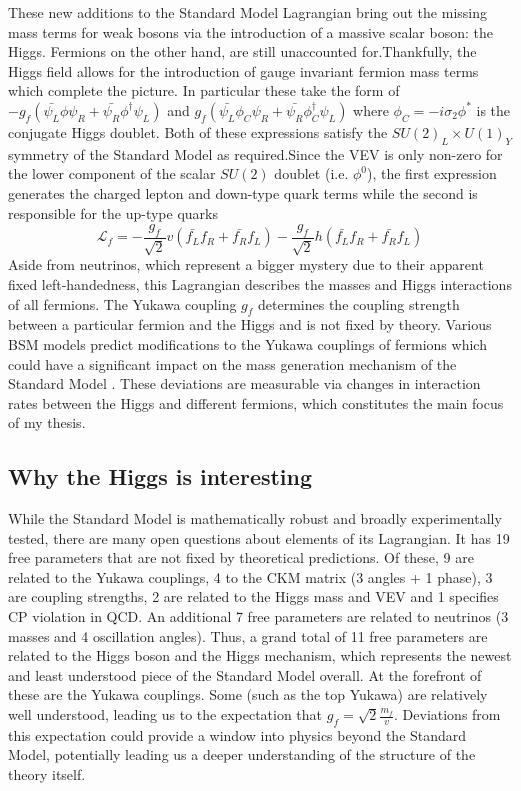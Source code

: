 These new additions to the Standard Model Lagrangian bring out the missing mass terms for weak bosons 
via the introduction of a massive scalar boson: the Higgs. Fermions on the other hand, are still unaccounted 
for.Thankfully, the Higgs field allows for the introduction of gauge invariant fermion mass terms which 
complete the picture. In particular these take the form of 
$-g_f(\bar{\psi_L}\phi\psi_R + \bar{\psi_R}\phi^{\dagger}\psi_L)$ and 
$g_f(\bar{\psi_L}\phi_C\psi_R + \bar{\psi_R}\phi_C^{\dagger}\psi_L)$ where $\phi_C = -i\sigma_2\phi^*$ 
is the conjugate Higgs doublet. Both of these expressions satisfy the $SU(2)_L \times U(1)_Y$ symmetry of 
the Standard Model as required.Since the VEV is only non-zero for the lower component of the scalar 
$SU(2)$ doublet (i.e. $\phi^0$), the first expression generates the charged lepton and down-type quark 
terms while the second is responsible for the up-type quarks
\begin{equation}
\mathcal{L}_f = -\frac{g_f}{\sqrt{2}}v(\bar{f_L}f_R + \bar{f_R}f_L) - 
\frac{g_f}{\sqrt{2}}h(\bar{f_L}f_R + \bar{f_R}f_L)
\end{equation}
Aside from neutrinos, which represent a bigger mystery due to their apparent fixed left-handedness, this 
Lagrangian describes the masses and Higgs interactions of all fermions. The Yukawa coupling 
$g_f$ determines the coupling strength between a particular fermion and the Higgs and is not fixed by 
theory. Various BSM models predict modifications to the Yukawa couplings of fermions which could have a 
significant impact on the mass generation mechanism of the Standard Model 
\cite{gunion-2hdm, carena-mssm}. These deviations are measurable via changes in interaction rates 
between the Higgs and different fermions, which constitutes the main focus of my thesis.

\subsection{Why the Higgs is interesting}

While the Standard Model is mathematically robust and broadly experimentally tested, there are many open 
questions about elements of its Lagrangian. It has 19 free parameters that are not fixed by theoretical 
predictions. Of these, 9 are related to the Yukawa couplings, 4 to the CKM matrix (3 angles + 1 phase), 3 are 
coupling strengths, 2 are related to the Higgs mass and VEV and 1 specifies CP violation in QCD. An additional 7 
free parameters are related to neutrinos (3 masses and 4 oscillation angles). Thus, a grand total of 11 free 
parameters are related to the Higgs boson and the Higgs mechanism, which represents the newest and least 
understood piece of the Standard Model overall. At the forefront of these are the Yukawa couplings. Some 
(such as the top Yukawa) are relatively well understood, leading us to the expectation that 
$g_f = \sqrt{2}\frac{m_f}{v}$. Deviations from this expectation could provide a window into physics beyond 
the Standard Model, potentially leading us a deeper understanding of the structure of the theory itself.  \par

